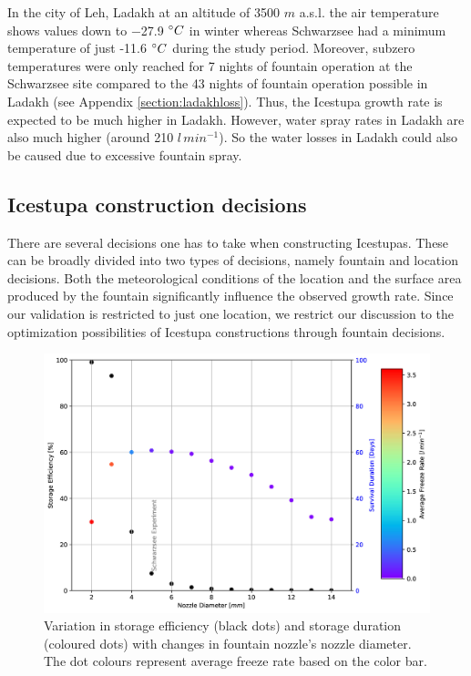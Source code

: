 \documentclass[utf8]{frontiersSCNS} %
\begin{document}
In the city of Leh, Ladakh at an altitude of 3500 $m$ a.s.l. the air temperature shows values down to −27.9 $\degree C$
in winter \citep{Chevuturi_2018} whereas Schwarzsee had a minimum temperature of just -11.6 $\degree C$ during the study
period. Moreover, subzero temperatures were only reached for 7 nights of fountain operation at the Schwarzsee site
compared to the 43 nights of fountain operation possible in Ladakh (see Appendix \ref{section:ladakhloss}). Thus, the
Icestupa growth rate is expected to be much higher in Ladakh. However, water spray rates in Ladakh are also much higher
(around 210 $l\,min^{-1}$). So the water losses in Ladakh could also be caused due to excessive fountain spray.

\subsection{Icestupa construction decisions} There are several decisions one has to take when constructing Icestupas.
These can be broadly divided into two types of decisions, namely fountain and location decisions.  Both the
meteorological conditions of the location and the surface area produced by the fountain significantly influence the
observed growth rate. Since our validation is restricted to just one location, we restrict our discussion to the
optimization possibilities of Icestupa constructions through fountain decisions.

  \begin{figure} \begin{center} \includegraphics[width=15 cm]{Figures/Figure_10.jpg} \end{center} \caption{Variation in
storage efficiency (black dots) and storage duration (coloured dots) with changes in fountain nozzle's nozzle diameter.
The dot colours represent average freeze rate based on the color bar.} \label{fig:dia_f} \end{figure}
  
\end{document}
